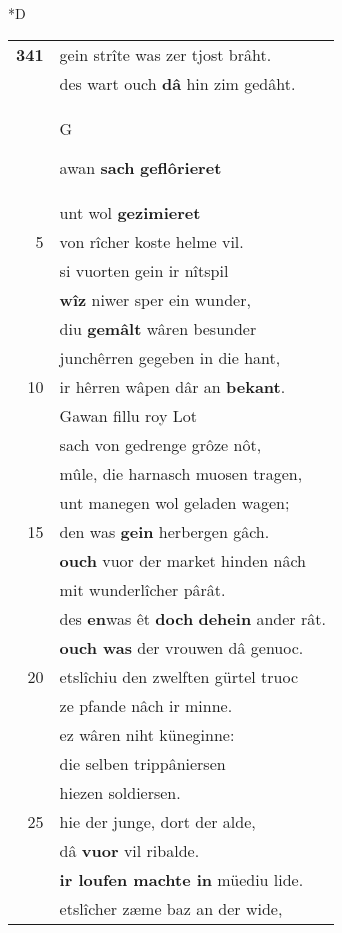 \documentclass[8pt,a4paper,notitlepage]{article}
\begin{document}
\begin{table}[ht]
\begin{minipage}[t]{0.5\linewidth}
\small
\begin{center}*D
\end{center}
\begin{tabular}{rl}
\textbf{341} & gein strîte was zer tjost brâht.\\ 
 & des wart ouch \textbf{dâ} hin zim gedâht.\\ 
 & \begin{large}G\end{large}awan \textbf{sach} \textbf{geflôrieret}\\ 
 & unt wol \textbf{gezimieret}\\ 
5 & von rîcher koste helme vil.\\ 
 & si vuorten gein ir nîtspil\\ 
 & \textbf{wîz} niwer sper ein wunder,\\ 
 & diu \textbf{gemâlt} wâren besunder\\ 
 & junchêrren gegeben in die hant,\\ 
10 & ir hêrren wâpen dâr an \textbf{bekant}.\\ 
 & Gawan fillu roy Lot\\ 
 & sach von gedrenge grôze nôt,\\ 
 & mûle, die harnasch muosen tragen,\\ 
 & unt manegen wol geladen wagen;\\ 
15 & den was \textbf{gein} herbergen gâch.\\ 
 & \textbf{ouch} vuor der market hinden nâch\\ 
 & mit wunderlîcher pârât.\\ 
 & des \textbf{en}was êt \textbf{doch} \textbf{dehein} ander rât.\\ 
 & \textbf{ouch was} der vrouwen dâ genuoc.\\ 
20 & etslîchiu den zwelften gürtel truoc\\ 
 & ze pfande nâch ir minne.\\ 
 & ez wâren niht küneginne:\\ 
 & die selben trippâniersen\\ 
 & hiezen soldiersen.\\ 
25 & hie der junge, dort der alde,\\ 
 & dâ \textbf{vuor} vil ribalde.\\ 
 & \textbf{ir loufen machte in} müediu lide.\\ 
 & etslîcher zæme baz an der wide,\\ 

\end{tabular}
\end{minipage}
\end{table}
\end{document}
